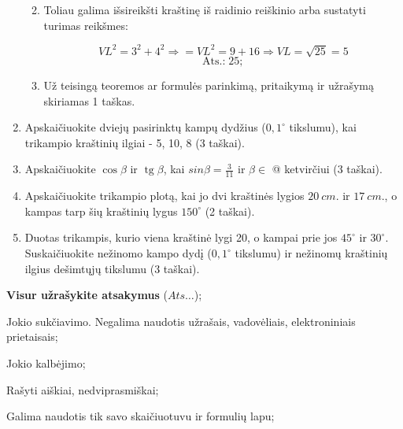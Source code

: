 \documentclass[a4paper]{article}
\makeatletter
\DeclareMathOperator{\tg}{tg}
\newcommand*{\rom}[1]{\expandafter\@slowromancap\romannumeral #1@}
\makeatother
\begin{document}
\begin{enumerate}
\begin{enumerate}
\begin{minipage}{0.5\textwidth}
                        \end{minipage}

                  \item \parbox{0.7\textwidth}{
                              Toliau galima išsireikšti kraštinę iš
                              raidinio reiškinio arba sustatyti turimas
                              reikšmes:
                        }

                        $$VL^{2}=3^{2}+4^{2} \Rightarrow=
                              VL^{2}=9+16 \Rightarrow VL=\sqrt{25}=5$$
                        $$\text{Ats.:} \; 25;$$

                  \item Už teisingą teoremos ar formulės parinkimą,
                        pritaikymą
                        ir užrašymą skiriamas 1 taškas.
            \end{enumerate}

      \item Apskaičiuokite dviejų pasirinktų kampų dydžius ($0,1^\circ$
            tikslumu), kai trikampio kraštinių ilgiai - 5, 10, 8 (3 taškai).

      \item Apskaičiuokite $\cos\beta$ ir $\tg \beta$, kai $sin \beta =
                  \frac{3}{11}$ ir $\beta \in$ \rom{2} ketvirčiui (3 taškai).

      \item Apskaičiuokite trikampio plotą, kai jo dvi kraštinės lygios
            $20\:cm.$ ir $17\:cm.$, o kampas tarp šių kraštinių lygus
            $150^\circ$ (2 taškai).

      \item Duotas trikampis, kurio viena kraštinė lygi 20, o kampai prie jos
            $45^\circ$ ir $30^\circ$. Suskaičiuokite nežinomo kampo dydį
            ($0,1^\circ$ tikslumu) ir
            nežinomų kraštinių ilgius dešimtųjų tikslumu (3 taškai).

\end{enumerate}

\begin{small}
      \begin{enumerate*}[label={(\arabic*)}]
            \item \textbf{Visur užrašykite atsakymus} ($Ats\ldots$);
            \item Jokio sukčiavimo. Negalima naudotis užrašais, vadovėliais,
            elektroniniais prietaisais;
            \item Jokio kalbėjimo;
            \item Rašyti aiškiai, nedviprasmiškai;
            \item Galima naudotis tik savo skaičiuotuvu ir formulių lapu;
      \end{enumerate*}
\end{small}
\end{document}
